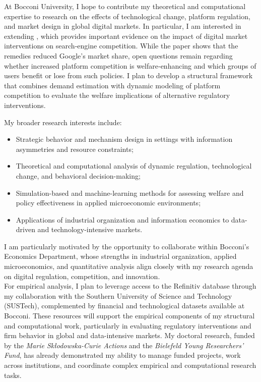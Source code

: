 \documentclass{nfr}
\begin{document}
At Bocconi University, I hope to contribute my theoretical and computational expertise to research on the effects of technological change, platform regulation, and market design in global digital markets. 
In particular, I am interested in extending \citet{decarolis2025competition}, which provides important evidence on the impact of digital market interventions on search‐engine competition. 
While the paper shows that the remedies reduced Google’s market share, open questions remain regarding whether increased platform competition is welfare‐enhancing and which groups of users benefit or lose from such policies. 
I plan to develop a structural framework that combines demand estimation with dynamic modeling of platform competition to evaluate the welfare implications of alternative regulatory interventions.

My broader research interests include:
\begin{itemize}
    \item Strategic behavior and mechanism design in settings with information asymmetries and resource constraints;
    \item Theoretical and computational analysis of dynamic regulation, technological change, and behavioral decision-making;
    \item Simulation-based and machine-learning methods for assessing welfare and policy effectiveness in applied microeconomic environments;
    \item Applications of industrial organization and information economics to data-driven and technology-intensive markets.
\end{itemize}

I am particularly motivated by the opportunity to collaborate within Bocconi’s Economics Department, whose strengths in industrial organization, applied microeconomics, and quantitative analysis align closely with my research agenda on digital regulation, competition, and innovation.\\

For empirical analysis, I plan to leverage access to the Refinitiv database through my collaboration with the Southern University of Science and Technology (SUSTech), complemented by financial and technological datasets available at Bocconi. 
These resources will support the empirical components of my structural and computational work, particularly in evaluating regulatory interventions and firm behavior in global and data-intensive markets. 
My doctoral research, funded by the \textit{Marie Skłodowska-Curie Actions} and the \textit{Bielefeld Young Researchers’ Fund}, has already demonstrated my ability to manage funded projects, work across institutions, and coordinate complex empirical and computational research tasks.\\
\end{document}
